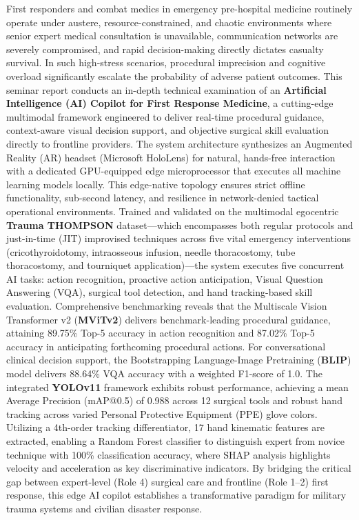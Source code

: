 \documentclass[12pt,a4paper]{report}
\begin{document}
\vspace{0.6cm}
\noindent
First responders and combat medics in emergency pre-hospital medicine routinely operate under austere, resource-constrained, and chaotic environments where senior expert medical consultation is unavailable, communication networks are severely compromised, and rapid decision-making directly dictates casualty survival. In such high-stress scenarios, procedural imprecision and cognitive overload significantly escalate the probability of adverse patient outcomes. This seminar report conducts an in-depth technical examination of an \textbf{Artificial Intelligence (AI) Copilot for First Response Medicine}, a cutting-edge multimodal framework engineered to deliver real-time procedural guidance, context-aware visual decision support, and objective surgical skill evaluation directly to frontline providers. The system architecture synthesizes an Augmented Reality (AR) headset (Microsoft HoloLens) for natural, hands-free interaction with a dedicated GPU-equipped edge microprocessor that executes all machine learning models locally. This edge-native topology ensures strict offline functionality, sub-second latency, and resilience in network-denied tactical operational environments. Trained and validated on the multimodal egocentric \textbf{Trauma THOMPSON} dataset---which encompasses both regular protocols and just-in-time (JIT) improvised techniques across five vital emergency interventions (cricothyroidotomy, intraosseous infusion, needle thoracostomy, tube thoracostomy, and tourniquet application)---the system executes five concurrent AI tasks: action recognition, proactive action anticipation, Visual Question Answering (VQA), surgical tool detection, and hand tracking-based skill evaluation. Comprehensive benchmarking reveals that the Multiscale Vision Transformer v2 (\textbf{MViTv2}) delivers benchmark-leading procedural guidance, attaining 89.75\% Top-5 accuracy in action recognition and 87.02\% Top-5 accuracy in anticipating forthcoming procedural actions. For conversational clinical decision support, the Bootstrapping Language-Image Pretraining (\textbf{BLIP}) model delivers 88.64\% VQA accuracy with a weighted F1-score of 1.0. The integrated \textbf{YOLOv11} framework exhibits robust performance, achieving a mean Average Precision (mAP@0.5) of 0.988 across 12 surgical tools and robust hand tracking across varied Personal Protective Equipment (PPE) glove colors. Utilizing a 4th-order tracking differentiator, 17 hand kinematic features are extracted, enabling a Random Forest classifier to distinguish expert from novice technique with 100\% classification accuracy, where SHAP analysis highlights velocity and acceleration as key discriminative indicators. By bridging the critical gap between expert-level (Role 4) surgical care and frontline (Role 1--2) first response, this edge AI copilot establishes a transformative paradigm for military trauma systems and civilian disaster response.
\end{document}
